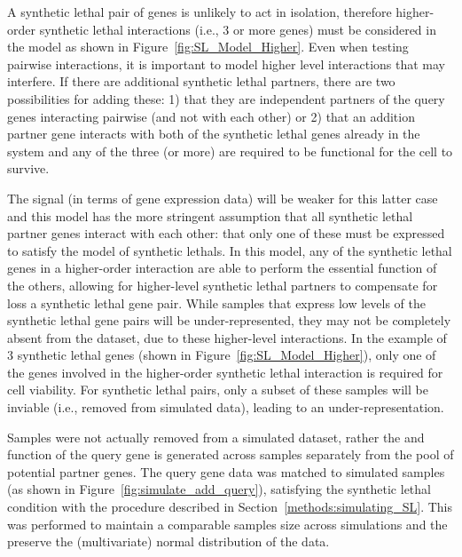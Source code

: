 A \gls{synthetic lethal} pair of genes is unlikely to act in isolation, therefore higher-order \gls{synthetic lethal} interactions (i.e., 3 or more genes) must be considered in the model as shown in Figure~\ref{fig:SL_Model_Higher}. Even when testing pairwise interactions, it is important to model higher level interactions that may interfere. If there are additional \gls{synthetic lethal} partners, there are two possibilities for adding these: 1) that they are independent partners of the query genes interacting pairwise (and not with each other) or 2) that an addition partner gene interacts with both of the \gls{synthetic lethal} genes already in the system and any of the three (or more) are required to be functional for the cell to survive.

The signal (in terms of \gls{gene expression} data) will be weaker for this latter case and this model has the more stringent assumption that all \gls{synthetic lethal} partner genes interact with each other: that only one of these must be expressed to satisfy the model of \glspl{synthetic lethal}. In this model, any of the \gls{synthetic lethal} genes in a higher-order interaction are able to perform the essential function of the others, allowing for higher-level \gls{synthetic lethal} partners to compensate for loss a \gls{synthetic lethal} gene pair. While samples that express low levels of the \gls{synthetic lethal} gene pairs will be under-represented, they may not be completely absent from the dataset, due to these higher-level interactions. In the example of 3 \gls{synthetic lethal} genes (shown in Figure~\ref{fig:SL_Model_Higher}), only one of the genes involved in the higher-order \gls{synthetic lethal} interaction is required for cell viability. For \gls{synthetic lethal} pairs, only a subset of these samples will be inviable (i.e., removed from simulated data), leading to an under-representation.

Samples were not actually removed from a simulated dataset, rather the  and function of the query gene is generated across samples separately from the pool of potential partner genes. The query gene data was matched to simulated samples (as shown in Figure~\ref{fig:simulate_add_query}), satisfying the \gls{synthetic lethal} condition with the procedure described in Section~\ref{methods:simulating_SL}. This was performed to maintain a comparable samples size across simulations and the preserve the (multivariate) normal distribution of the data. 

\FloatBarrier

